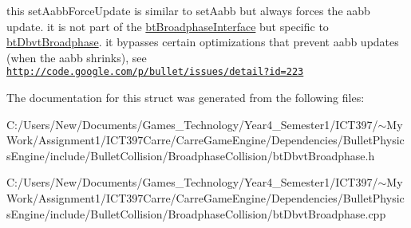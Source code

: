 this setAabbForceUpdate is similar to setAabb but always forces the aabb update. it is not part of the \hyperlink{classbt_broadphase_interface}{btBroadphaseInterface} but specific to \hyperlink{structbt_dbvt_broadphase}{btDbvtBroadphase}. it bypasses certain optimizations that prevent aabb updates (when the aabb shrinks), see \href{http://code.google.com/p/bullet/issues/detail?id=223}{\tt http://code.google.com/p/bullet/issues/detail?id=223} 

The documentation for this struct was generated from the following files:\begin{CompactItemize}
\item 
C:/Users/New/Documents/Games\_\-Technology/Year4\_\-Semester1/ICT397/$\sim$My Work/Assignment1/ICT397Carre/CarreGameEngine/Dependencies/BulletPhysicsEngine/include/BulletCollision/BroadphaseCollision/btDbvtBroadphase.h\item 
C:/Users/New/Documents/Games\_\-Technology/Year4\_\-Semester1/ICT397/$\sim$My Work/Assignment1/ICT397Carre/CarreGameEngine/Dependencies/BulletPhysicsEngine/include/BulletCollision/BroadphaseCollision/btDbvtBroadphase.cpp\end{CompactItemize}

